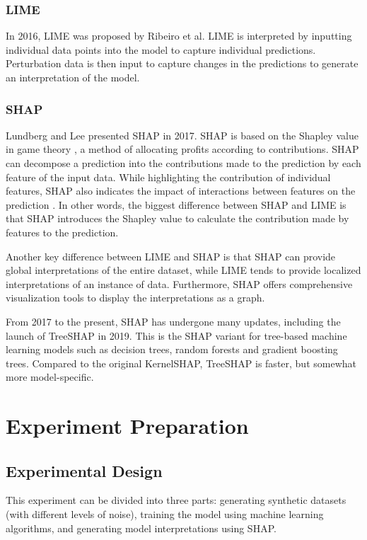 \documentclass[runningheads,a4paper]{llncs}
\begin{document}
\subsubsection{LIME}
In 2016, LIME was proposed by Ribeiro et al\cite{ribeiro2016should}.
LIME is interpreted by inputting individual data points into the model to capture individual predictions. Perturbation data is then input to capture changes in the predictions to generate an interpretation of the model.
\subsubsection{SHAP}
Lundberg and Lee presented SHAP in 2017\cite{lundberg2017unified}.
SHAP is based on the Shapley value in game theory \cite{Shapley1953}, a method of allocating profits according to contributions.
SHAP can decompose a prediction into the contributions made to the prediction by each feature of the input data.
While highlighting the contribution of individual features, SHAP also indicates the impact of interactions between features on the prediction \cite{lundberg2017unified}.
In other words, the biggest difference between SHAP and LIME is that SHAP introduces the Shapley value to calculate the contribution made by features to the prediction\cite{lundberg2017unified}.

Another key difference between LIME and SHAP is that SHAP can provide global interpretations of the entire dataset\cite{lundberg2017unified}, while LIME tends to provide localized interpretations of an instance of data\cite{ribeiro2016should}. Furthermore, SHAP offers comprehensive visualization tools to display the interpretations as a graph.

From 2017 to the present, SHAP has undergone many updates, including the launch of TreeSHAP in 2019\cite{lundberg2019consistent}.
This is the SHAP variant for tree-based machine learning models such as decision trees, random forests and gradient boosting trees. 
Compared to the original KernelSHAP, TreeSHAP is faster, but somewhat more model-specific.

\section{Experiment Preparation}

\subsection{Experimental Design}
This experiment can be divided into three parts: generating synthetic datasets (with different levels of noise), training the model using machine learning algorithms, and generating model interpretations using SHAP.
\end{document}
